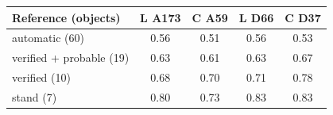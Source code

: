\begin{tabular}{lcccc}
\toprule
Reference (objects) & L A173 & C A59 & L D66 & C D37 \\
\midrule
automatic (60) & 0.56 & 0.51 & 0.56 & 0.53 \\
verified + probable (19) & 0.63 & 0.61 & 0.63 & 0.67 \\
verified (10) & 0.68 & 0.70 & 0.71 & 0.78 \\
stand (7) & 0.80 & 0.73 & 0.83 & 0.83 \\
\bottomrule
\end{tabular}
